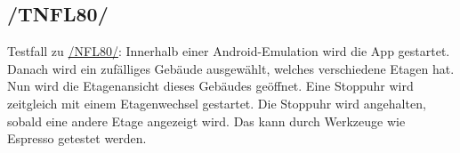 \subsection*{/TNFL80/}

\label{/TNFL80/} Testfall zu \hyperref[/NFL80/]{/NFL80/}: Innerhalb einer \Gls{Android}-\Gls{Emulation} wird die App gestartet.
Danach wird ein zufälliges Gebäude ausgewählt, welches verschiedene Etagen hat.
Nun wird die Etagenansicht dieses Gebäudes geöffnet.
Eine Stoppuhr wird zeitgleich mit einem Etagenwechsel gestartet.
Die Stoppuhr wird angehalten, sobald eine andere Etage angezeigt wird.
Das kann durch Werkzeuge wie \Gls{Espresso} getestet werden.